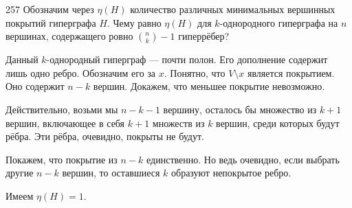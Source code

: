 \begin{task}{257}
Обозначим через $\eta(H)$ количество различных минимальных вершинных покрытий гиперграфа $H$. Чему равно $\eta(H)$ для $k$-однородного гиперграфа на $n$ вершинах, содержащего ровно $\binom{n}{k} - 1$ гиперрёбер?
\end{task}

\begin{solution}
Данный $k$-однородный гиперграф --- почти полон. Его дополнение содержит лишь одно ребро. Обозначим его за $x$. Понятно, что $V \setminus x$ является покрытием. Оно содержит $n - k$ вершин. Докажем, что меньшее покрытие невозможно.\par
Действительно, возьми мы $n - k - 1$ вершину, осталось бы множество из $k + 1$ вершин, включающее в себя $k + 1$ множеств из $k$ вершин, среди которых будут рёбра. Эти рёбра, очевидно, покрыты не будут.\par
Покажем, что покрытие из $n - k$ единственно. Но ведь очевидно, если выбрать другие $n - k$ вершин, то оставшиеся $k$ образуют непокрытое ребро.\par
Имеем $\eta(H) = 1$.

\end{solution}
